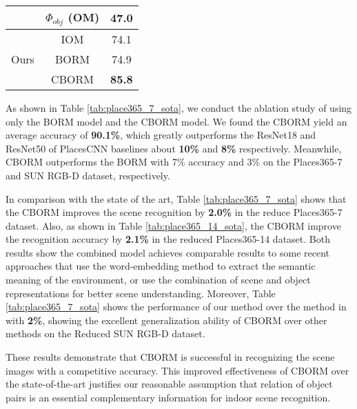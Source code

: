 \begin{table}[htbp]
\begin{minipage}[t]{.44\textwidth}
\begin{tabular}{c|cc}
            & $\Phi_{obj}$ (OM) 		   & 47.0	 \\ \hline
			\multirow{3}{*}{Ours}  
			& IOM          & 74.1    \\
			& BORM         & 74.9    \\ \cdashline{2-3}
			& CBORM & \textbf{85.8}				\\	\hline
		\end{tabular}
	\end{minipage}
\end{table}



As shown in Table \ref{tab:place365_7_sota}, we conduct the ablation study of using only the BORM model and the CBORM model. We found the CBORM yield an average accuracy of \textbf{90.1\%}, which greatly outperforms the ResNet18 and ResNet50 of PlacesCNN baselines about \textbf{10\%} and \textbf{8\%} respectively. Meanwhile, CBORM outperforms the BORM with 7\% accuracy and 3\% on the Places365-7 and SUN RGB-D dataset, respectively.


In comparison with the state of the art, Table \ref{tab:place365_7_sota} shows that the CBORM improves the scene recognition by \textbf{2.0\%} in the reduce Places365-7 dataset.  Also, as shown in Table \ref{tab:place365_14_sota}, the CBORM improve the recognition accuracy by \textbf{2.1\%} in the reduced Places365-14 dataset. Both results show the combined model achieves comparable results to some recent approaches that use the word-embedding method to extract the semantic meaning of the environment, or use the combination of scene and object representations for better scene understanding. Moreover, Table \ref{tab:place365_7_sota} shows the performance of our method over the method in \cite{pal2019deduce} with \textbf{2\%}, showing the excellent generalization ability of CBORM over other methods on the Reduced SUN RGB-D dataset.

These results demonstrate that CBORM is successful in recognizing the scene images with a competitive accuracy. This improved effectiveness of CBORM over the state-of-the-art justifies our reasonable assumption that relation of object pairs is an essential complementary information for indoor scene recognition.



